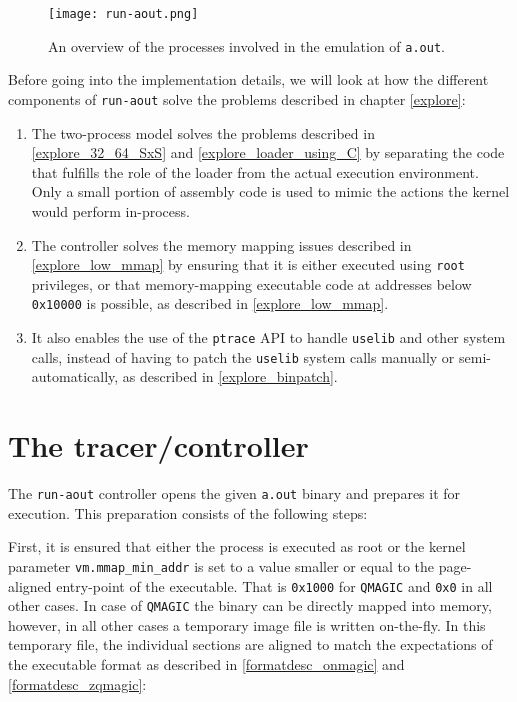 \documentclass[draft,final]{vutinfth} %
\begin{document}
\begin{figure}[H]
    \centering
    \texttt{[image: run-aout.png]}
    \caption{An overview of the processes involved in the emulation of \texttt{a.out}.}
    \label{fig:architecture_overview}
\end{figure}

Before going into the implementation details, we will look at how the different components of \texttt{run-aout} solve the problems described in chapter \ref{explore}:

\begin{enumerate}
    \item The two-process model solves the problems described in \ref{explore_32_64_SxS} and \ref{explore_loader_using_C} by separating the code that fulfills the role of the loader from the actual execution environment. Only a small portion of assembly code is used to mimic the actions the kernel would perform in-process.
    
    \item The controller solves the memory mapping issues described in \ref{explore_low_mmap} by ensuring that it is either executed using \texttt{root} privileges, or that memory-mapping executable code at addresses below \texttt{0x10000} is possible, as described in \ref{explore_low_mmap}.
    
    \item It also enables the use of the \texttt{ptrace} API to handle \texttt{uselib} and other system calls, instead of having to patch the \texttt{uselib} system calls manually or semi-automatically, as described in \ref{explore_binpatch}.
\end{enumerate}

\section{The tracer/controller}
\label{solution_tracer}

The \texttt{run-aout} controller opens the given \texttt{a.out} binary and prepares it for execution. This preparation consists of the following steps:

First, it is ensured that either the process is executed as root or the kernel parameter \texttt{vm.mmap\_min\_addr} is set to a value smaller or equal to the page-aligned entry-point of the executable. That is \texttt{0x1000} for \texttt{QMAGIC} and \texttt{0x0} in all other cases. In case of \texttt{QMAGIC} the binary can be directly mapped into memory, however, in all other cases a temporary image file is written on-the-fly. In this temporary file, the individual sections are aligned to match the expectations of the executable format as described in \ref{formatdesc_onmagic} and \ref{formatdesc_zqmagic}:
\end{document}
